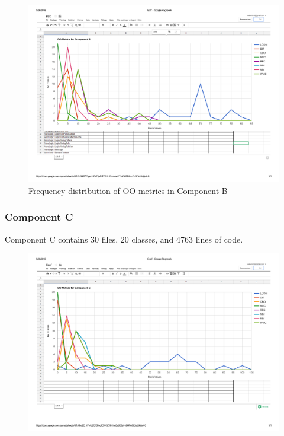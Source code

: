 \begin{landscape}
\setlength\LTleft{-.5in}
	\begin{figure}
	\label{fig:blcgraph}
	\caption{Frequency distribution of OO-metrics in Component B}
	\centering
	\includegraphics[width=\textwidth]{images/blc.pdf}
	\end{figure}
\end{landscape}






\subsubsection{Component C}
Component C contains 30 files, 20 classes, and 4763 lines of code. 



\begin{landscape}
\setlength\LTleft{-.5in}
	\begin{figure}
	\centering
	\includegraphics[width=\textwidth]{images/conf.pdf}
	\end{figure}
\end{landscape}



